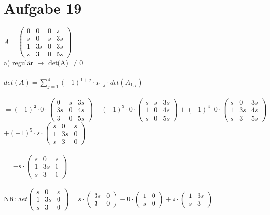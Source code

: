 \documentclass[12pt,a4paper]{article}
\begin{document}
\section*{Aufgabe 19}
$A=\begin{pmatrix} 0&0&0&s\\s&0&s&3s\\1&3s&0&3s\\s&3&0&5s \end{pmatrix}$\\
\newpage
\noindent
a) regulär $\rightarrow$ det(A) $\ne$0\\
\\
\indent$det(A)=\sum \limits_{j=1}^{4}(-1)^{1+j}\cdot a_{1,j}\cdot det(A_{1,j})$\\
\\
$=(-1)^2\cdot 0 \cdot \begin{pmatrix} 0&s&3s\\3s&0&4s\\3&0&5s \end{pmatrix} + (-1)^3\cdot 0 \cdot \begin{pmatrix} s&s&3s\\1&0&4s\\s&0&5s \end{pmatrix}+ (-1)^4\cdot 0 \cdot \begin{pmatrix} s&0&3s\\1&3s&4s\\s&3&5s \end{pmatrix}$\\
$+(-1)^5\cdot s \cdot \begin{pmatrix} s&0&s\\1&3s&0\\s&3&0 \end{pmatrix}$\\
\\
$=-s \cdot \begin{pmatrix} s&0&s\\1&3s&0\\s&3&0 \end{pmatrix}$\\
\\
\indent NR: $det\begin{pmatrix} s&0&s\\1&3s&0\\s&3&0 \end{pmatrix}=s\cdot \begin{pmatrix} 3s&0\\3&0 \end{pmatrix} -0\cdot\begin{pmatrix} 1&0\\s&0 \end{pmatrix}+s\cdot\begin{pmatrix} 1&3s\\s&3 \end{pmatrix}$
\end{document}
